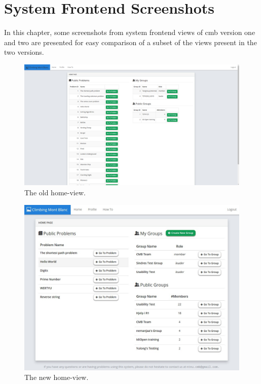 \chapter{System Frontend Screenshots}
\label{apdx:screenshots}
In this chapter, some screenshots from system frontend views of \gls{cmb} version one and two are presented for easy comparison of a subset of the views present in the two versions.

\begin{figure}[h!]
    \centering
    \includegraphics[width=1.0\textwidth]{oldscreenshots/frontpage.png}
    \caption[]{The old home-view.}
    \label{fig:apdx-old-home}
\end{figure}

\begin{figure}[h!]
    \centering
    \includegraphics[width=1.0\textwidth]{screenshots/frontpage.jpg}
    \caption[]{The new home-view.}
    \label{fig:apdx-new-home}
\end{figure}

